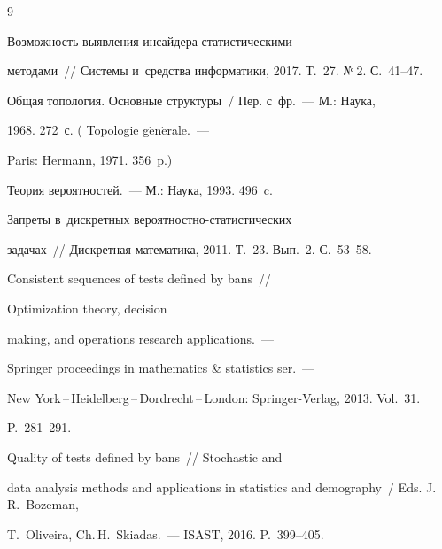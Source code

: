 {\small\frenchspacing


{%




\begin{thebibliography}{9}




 Возможность выявления инсайдера статистическими 


методами~/\!\!/ Системы и~средства информатики, 2017. Т.~27. №\,2. С.~41--47.




 Общая топология. Основные структуры~/ Пер. с~фр.~--- М.: Наука, 


1968. 272~с. ( Topologie g$\acute{\mbox{e}}$n$\acute{\mbox{e}}$rale.~--- 


Paris: Hermann, 1971. 356~p.)




 Теория вероятностей.~--- М.: Наука, 1993. 496~c.




 Запреты в~дискретных вероятностно-статистических 


задачах~/\!\!/ Дискретная математика, 2011. Т.~23. Вып.~2. С.~53--58.




 Consistent sequences of tests defined by bans~/\!\!/ 


 Optimization theory, decision 


making, and operations research applications.~---  


Springer proceedings in mathematics \& statistics ser.~---


New York\,--\,Heidelberg\,--\,Dordrecht\,--\,London: Springer-Verlag, 2013. Vol.~31. 


P.~281--291.




 Quality of tests defined by bans~/\!\!/ Stochastic and 


data analysis methods and applications in statistics and demography~/ Eds. J.\,R.~Bozeman, 


T.~Oliveira, Ch.\,H.~Skiadas.~--- ISAST, 2016. P.~399--405.


        \end{thebibliography}


} }








